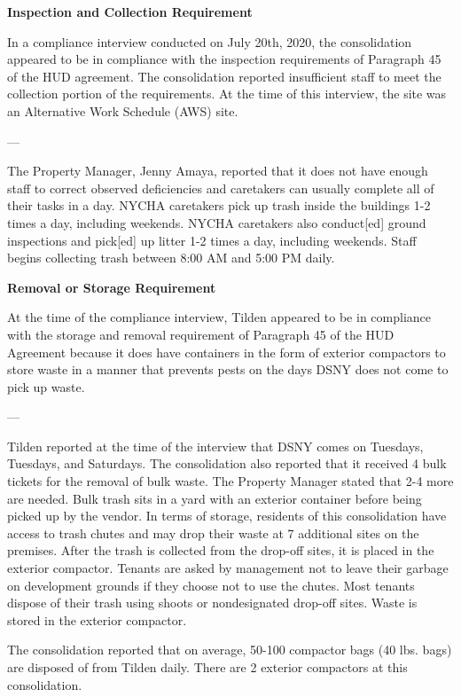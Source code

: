 
\textbf{Inspection and Collection Requirement}

In a compliance interview conducted on July 20th, 2020, the consolidation appeared to be in compliance with the inspection requirements of Paragraph 45 of the HUD agreement. The consolidation reported insufficient staff to meet the collection portion of the requirements. At the time of this interview, the site was an Alternative Work Schedule (AWS) site. 

---

The Property Manager, Jenny Amaya, reported that it does not have enough staff to correct observed deficiencies and caretakers can usually complete all of their tasks in a day. NYCHA caretakers pick up trash inside the buildings 1-2 times a day, including weekends. NYCHA caretakers also conduct[ed] ground inspections and pick[ed] up litter 1-2 times a day, including weekends. Staff begins collecting trash between 8:00 AM and 5:00 PM daily. 

\textbf{Removal or Storage Requirement}

At the time of the compliance interview, Tilden appeared to be in compliance with the storage and removal requirement of Paragraph 45 of the HUD Agreement because it does have containers in the form of exterior compactors to store waste in a manner that prevents pests on the days DSNY does not come to pick up waste.

---

Tilden reported at the time of the interview that DSNY comes on Tuesdays, Tuesdays, and Saturdays. The consolidation also reported that it received 4 bulk tickets for the removal of bulk waste. The Property Manager stated that 2-4 more are needed. Bulk trash sits in a yard with an exterior container before being picked up by the vendor. In terms of storage, residents of this consolidation have access to trash chutes and may drop their waste at 7 additional sites on the premises. After the trash is collected from the drop-off sites, it is placed in the exterior compactor. Tenants are asked by management not to leave their garbage on development grounds if they choose not to use the chutes. Most tenants dispose of their trash using shoots or nondesignated drop-off sites. Waste is stored in the exterior compactor. 

The consolidation reported that on average, 50-100 compactor bags (40 lbs. bags) are disposed of from Tilden daily. There are 2 exterior compactors at this consolidation.